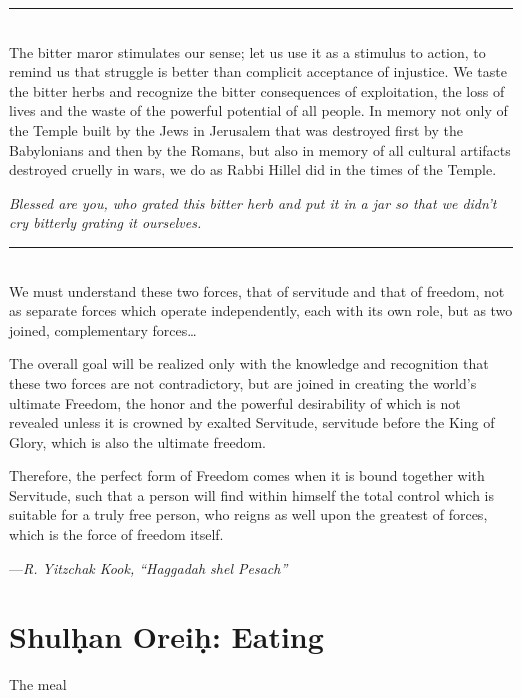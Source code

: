 \documentclass[a4paper,12pt,openany]{memoir}
\newcommand{\HgSource}[1]{\hfill{\small---\itshape{#1}}}
\newcommand{\HgFill}{\vfill \hrule \vfill}
\newenvironment{HgEnglish}{\strut\\\noindent}{\vspace{1em}}
\newcommand{\SSrc}{\textsuperscript{\upshape{[S]}}}
\begin{document}
\HgFill

\begin{HgEnglish}
  The bitter maror stimulates our sense; let us use it as a stimulus to action,
  to remind us that struggle is better than complicit acceptance of injustice.
  We taste the bitter herbs and recognize the bitter consequences of
  exploitation, the loss of lives and the waste of the powerful potential of all
  people. In memory not only of the Temple built by the Jews in Jerusalem that
  was destroyed first by the Babylonians and then by the Romans, but also in
  memory of all cultural artifacts destroyed cruelly in wars, we do as Rabbi
  Hillel did in the times of the Temple.

  {\itshape Blessed are you, who grated this bitter herb and put it in a jar so
  that we didn’t cry bitterly grating it ourselves.} \SSrc
\end{HgEnglish}

\HgFill

\begin{HgEnglish}
  We must understand these two forces, that of servitude and that of freedom,
  not as separate forces which operate independently, each with its own role,
  but as two joined, complementary forces\ldots

  The overall goal will be realized only with the knowledge and recognition that
  these two forces are not contradictory, but are joined in creating the world’s
  ultimate Freedom, the honor and the powerful desirability of which is not
  revealed unless it is crowned by exalted Servitude, servitude before the King
  of Glory, which is also the ultimate freedom.

  Therefore, the perfect form of Freedom comes when it is bound together with
  Servitude, such that a person will find within himself the total control which
  is suitable for a truly free person, who reigns as well upon the greatest of
  forces, which is the force of freedom itself.

  \HgSource{R. Yitzchak Kook, ``Haggadah shel Pesach''}
\end{HgEnglish}


\chapter*{Shul\d{h}an Orei\d{h}: Eating}
\vfill
\begin{center}
  \fontsize{50pt}{50pt}
  \selectfont
  The
  meal
\end{center}
\vfill
\end{document}
